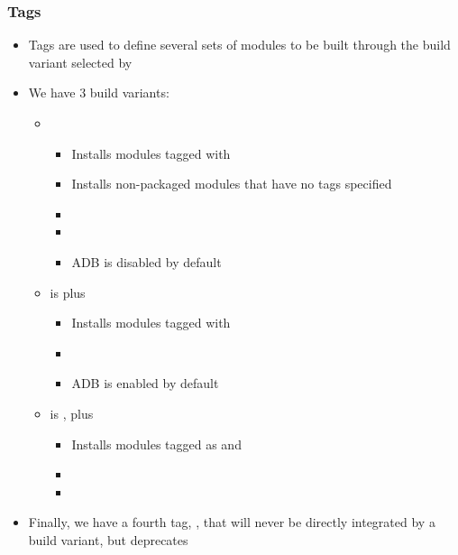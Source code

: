 \begin{frame}
  \frametitle{Tags}
  \begin{itemize}
  \item Tags are used to define several sets of modules to be
    built through the build variant selected by 
  \item We have 3 build variants:
    \begin{itemize}
    \item {}
      \begin{itemize}
      \item Installs modules tagged with 
      \item Installs non-packaged modules that have no tags specified
      \item {}
      \item {}
      \item ADB is disabled by default
      \end{itemize}
    \item {} is  plus
      \begin{itemize}
      \item Installs modules tagged with 
      \item {}
      \item ADB is enabled by default
      \end{itemize}
    \item {} is , plus
      \begin{itemize}
      \item Installs modules tagged as  and
      \item {}
      \item {}
      \end{itemize}
    \end{itemize}
  \item Finally, we have a fourth tag, , that will never
    be directly integrated by a build variant, but deprecates 
  \end{itemize}
\end{frame}


